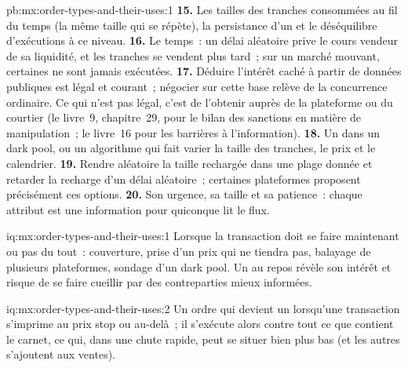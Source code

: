 \begin{solution}{pb:mx:order-types-and-their-uses:1}
\textbf{15.} Les tailles des tranches consommées au fil du temps (la même taille qui se répète), la persistance d'un  et le déséquilibre d'exécutions à ce niveau.
\textbf{16.} Le temps~: un délai aléatoire prive le cours vendeur de sa liquidité, et les tranches se vendent plus tard~; sur un marché mouvant, certaines ne sont jamais exécutées.
\textbf{17.} Déduire l'intérêt caché à partir de données publiques est légal et courant~; négocier sur cette base relève de la concurrence ordinaire. Ce qui n'est pas légal, c'est de l'obtenir
auprès de la plateforme ou du courtier (le livre~9, chapitre~29, pour le bilan des sanctions en matière de manipulation~; le livre~16 pour les barrières à l'information).
\textbf{18.} Un  dans un dark pool, ou un algorithme qui fait varier la taille des tranches, le prix et le calendrier.
\textbf{19.} Rendre aléatoire la taille rechargée dans une plage donnée et retarder la recharge d'un délai aléatoire~; certaines plateformes proposent précisément ces options.
\textbf{20.} Son urgence, sa taille et sa patience~: chaque attribut est une information pour quiconque lit le flux.
\end{solution}

\begin{solution}{iq:mx:order-types-and-their-uses:1}
Lorsque la transaction doit se faire maintenant ou pas du tout~: couverture, prise d'un prix qui ne tiendra pas, balayage de plusieurs plateformes, sondage d'un dark pool. Un 
au repos révèle son intérêt et risque de se faire cueillir par des contreparties mieux informées. 
\end{solution}

\begin{solution}{iq:mx:order-types-and-their-uses:2}
Un ordre qui devient un  lorsqu'une transaction s'imprime au prix stop ou au-delà~; il s'exécute alors contre tout ce que contient le carnet, ce qui, dans une
chute rapide, peut se situer bien plus bas (et les autres  s'ajoutent aux ventes). 
\end{solution}


